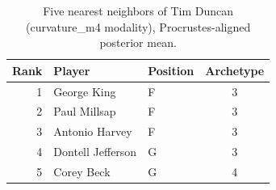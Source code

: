 \begin{table}[htbp]
  \centering\small
  \begin{tabular}{rllc}
    \toprule
    Rank & Player & Position & Archetype \\
    \midrule
    1 & George King & F & 3 \\
    2 & Paul Millsap & F & 3 \\
    3 & Antonio Harvey & F & 3 \\
    4 & Dontell Jefferson & G & 3 \\
    5 & Corey Beck & G & 4 \\
    \bottomrule
  \end{tabular}
  \caption{Five nearest neighbors of Tim Duncan (curvature_m4 modality), Procrustes-aligned posterior mean.}
  \label{tab:Tim_Duncan_neighbors_curvature_m4}
\end{table}


